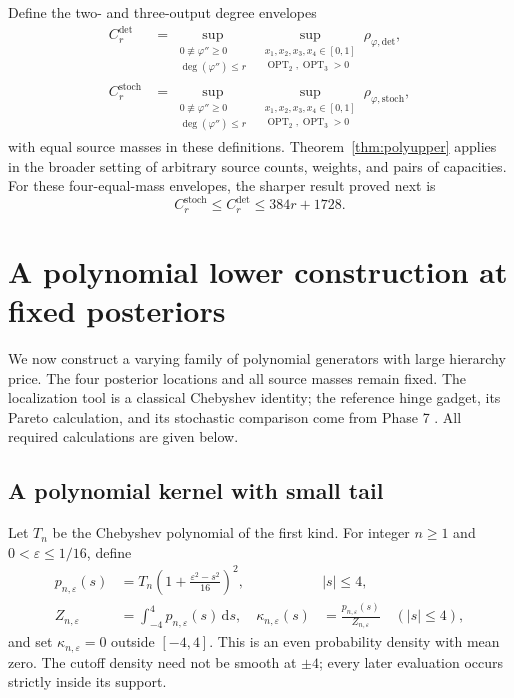 \documentclass[11pt]{article}
\theoremstyle{definition}\newtheorem{definition}[theorem]{Definition}
\theoremstyle{remark}\newtheorem{remark}[theorem]{Remark}
\newcommand{\ph}{\varphi}
\newcommand{\OPT}{\operatorname{OPT}}
\newcommand{\rd}{\,\mathrm d}
\newcommand{\detp}{\mathrm{det}}
\newcommand{\stp}{\mathrm{stoch}}
\begin{document}
Define the two- and three-output degree envelopes
\begin{align}
C_r^{\detp}&=\sup_{\substack{0\not\equiv\ph''\ge0\\\deg(\ph'')\le r}}
\ \sup_{\substack{x_1,x_2,x_3,x_4\in[0,1]\\\OPT_2,\OPT_3>0}}
\rho_{\ph,\detp},\label{eq:envelope}\\
C_r^{\stp}&=\sup_{\substack{0\not\equiv\ph''\ge0\\\deg(\ph'')\le r}}
\ \sup_{\substack{x_1,x_2,x_3,x_4\in[0,1]\\\OPT_2,\OPT_3>0}}
\rho_{\ph,\stp},\nonumber
\end{align}
with equal source masses in these definitions. Theorem~\ref{thm:polyupper} applies in the broader setting of arbitrary source counts, weights, and pairs of capacities. For these four-equal-mass envelopes, the sharper result proved next is
\begin{equation}
C_r^{\stp}\le C_r^{\detp}\le384r+1728.
\label{eq:envelopeupper}
\end{equation}


\section{A polynomial lower construction at fixed posteriors}
\label{sec:lower}
We now construct a varying family of polynomial generators with large hierarchy price. The four posterior locations and all source masses remain fixed. The localization tool is a classical Chebyshev identity; the reference hinge gadget, its Pareto calculation, and its stochastic comparison come from Phase 7 \cite[Section 4]{huang7}. All required calculations are given below.

\subsection{A polynomial kernel with small tail}
Let $T_n$ be the Chebyshev polynomial of the first kind. For integer $n\ge1$ and $0<\varepsilon\le1/16$, define
\begin{align}
p_{n,\varepsilon}(s)&=T_n\left(1+\frac{\varepsilon^2-s^2}{16}\right)^2,
&&|s|\le4,\label{eq:chebkernel}\\
Z_{n,\varepsilon}&=\int_{-4}^4p_{n,\varepsilon}(s)\rd s,
&\kappa_{n,\varepsilon}(s)&=\frac{p_{n,\varepsilon}(s)}{Z_{n,\varepsilon}}
\quad(|s|\le4),\nonumber
\end{align}
and set $\kappa_{n,\varepsilon}=0$ outside $[-4,4]$. This is an even probability density with mean zero. The cutoff density need not be smooth at $\pm4$; every later evaluation occurs strictly inside its support.
\end{document}
